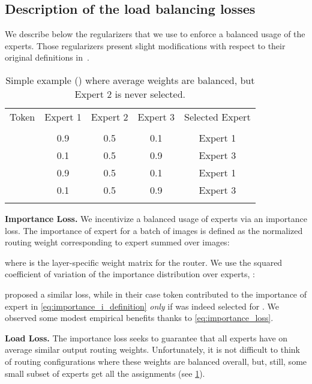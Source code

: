 \documentclass{article}
\begin{document}
\subsection{Description of the load balancing losses}

We describe below the regularizers that we use to enforce a balanced usage of the experts.
Those regularizers present slight modifications with respect to their original definitions in~\cite{shazeer2017outrageously}. 

\begin{table}
\begin{center}
\begin{tabular}{ c|c|c|c|c } 

 Token & Expert 1 & Expert 2 & Expert 3 & Selected Expert \\
  &  &  &  &  \\
 \hline
  & 0.9 & 0.5 & 0.1 & Expert 1 \\ 
  & 0.1 & 0.5 & 0.9 & Expert 3 \\
  & 0.9 & 0.5 & 0.1 & Expert 1 \\ 
  & 0.1 & 0.5 & 0.9 & Expert 3 \\
  &  &  &  &  \\
\end{tabular}
\vspace*{3mm}
\caption{\label{tab:load_loss_required} Simple example () where average weights are balanced, but Expert 2 is never selected.}
\end{center}
\end{table}

\textbf{Importance Loss.}
We incentivize a balanced usage of experts via an importance loss.
The importance of expert  for a batch of images  is defined as the normalized routing weight corresponding to expert  summed over images:

where  is the layer-specific weight matrix for the router. 
We use the squared coefficient of variation of the importance distribution over experts, :

\cite{shazeer2017outrageously} proposed a similar loss, while in their case token  contributed to the importance of expert  in \cref{eq:importance_i_definition} \emph{only} if  was indeed selected for .
We observed some modest empirical benefits thanks to \cref{eq:importance_loss}.

\textbf{Load Loss.}
The importance loss seeks to guarantee that all experts have on average similar output routing weights.
Unfortunately, it is not difficult to think of routing configurations where these weights are balanced overall, but, still, some small subset of experts get all the assignments (see \cref{tab:load_loss_required}).
\end{document}
